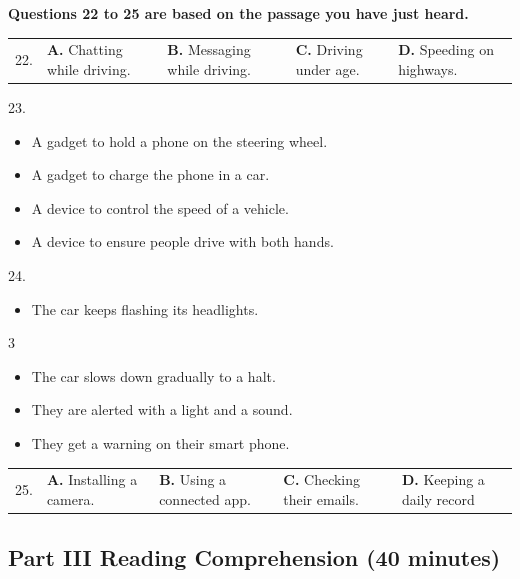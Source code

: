 \documentclass[UTF8,11pt]{ctexart}
\begin{document}
\textbf{Questions 22 to 25 are based on the passage you have just heard.}


\noindent\begin{tabularx}{\linewidth}{@{}lXXXX@{}}22. & \textbf{A.} Chatting while driving. & \textbf{B.} Messaging while driving. & \textbf{C.} Driving under age. & \textbf{D.} Speeding on highways.\\\end{tabularx}\par

23.


\begin{itemize}[leftmargin=2em,itemsep=.2em,topsep=.4em]\item[A.] A gadget to hold a phone on the steering wheel.
\item[B.] A gadget to charge the phone in a car.
\item[C.] A device to control the speed of a vehicle.
\item[D.] A device to ensure people drive with both hands.
\end{itemize}

24.


\begin{itemize}[leftmargin=2em,itemsep=.2em,topsep=.4em]\item[A.] The car keeps flashing its headlights.
\end{itemize}

3


\begin{itemize}[leftmargin=2em,itemsep=.2em,topsep=.4em]\item[B.] The car slows down gradually to a halt.
\item[C.] They are alerted with a light and a sound.
\item[D.] They get a warning on their smart phone.
\end{itemize}

\noindent\begin{tabularx}{\linewidth}{@{}lXXXX@{}}25. & \textbf{A.} Installing a camera. & \textbf{B.} Using a connected app. & \textbf{C.} Checking their emails. & \textbf{D.} Keeping a daily record\\\end{tabularx}\par

\subsection*{\textbf{Part} III \textbf{Reading Comprehension} \textbf{(40 minutes)}}
\end{document}
